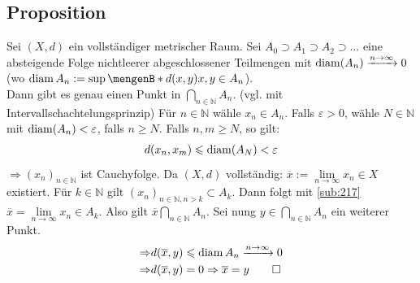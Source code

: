 \subsection[Proposition: \enquote{Intervallschachtelungsprinzip} in metrischen Räumen]{Proposition} %
\label{sub:218}
Sei $(X,d)$ ein vollständiger metrischer Raum. Sei $A_0 \supset A_1 \supset A_2 \supset \ldots $ eine absteigende Folge nichtleerer abgeschlossener Teilmengen mit 
$\operatorname{diam} (A_n) \xrightarrow{n \to \infty} 0 $ (wo $\diam A_n := \sup \set[d(x,y)]{x,y \in A_n} $). \\
Dann gibt es genau einen Punkt in $\bigcap_{n \in \mathds{N}} A_n$. \hfill {\footnotesize (vgl. mit Intervallschachtelungsprinzip)}
Für $n \in \mathds{N}$ wähle $x_n \in A_n$. Falls $\varepsilon >0$, wähle $N \in \mathds{N}$ mit $\operatorname{diam}(A_n) < \varepsilon$, falls $n \ge N$. Falls $n,m \ge N$, so
gilt:
\begin{align*}
	d(x_n, x_m) \leqslant \operatorname{diam}(A_N) < \varepsilon
\end{align*}
$\Rightarrow (x_n)_{n \in \mathds{N}}$ ist Cauchyfolge. Da $(X,d)$ vollständig: $\overline{x} := \lim\limits_{ n \to \infty} x_n \in X $ existiert. Für $k \in \mathds{N}$
gilt $(x_n)_{n \in \mathds{N}, n >k} \subset A_k$. Dann folgt mit \ref{sub:217} $\overline{x} = \lim\limits_{ n \to \infty} x_n \in A_k$. Also gilt
$\overline{x} \bigcap_{n \in \mathds{N}} A_n $. Sei nung $y \in \bigcap_{n \in \mathds{N}} A_n$ ein weiterer Punkt. 
\begin{align*}
	\Rightarrow & d(\overline{x}, y ) \leqslant \operatorname{diam} A_n \xrightarrow{n \to \infty} 0 \\
	\Rightarrow & d(\overline{x}, y ) = 0 \Rightarrow \overline{x} = y \tag*{$\square$} 
\end{align*}

